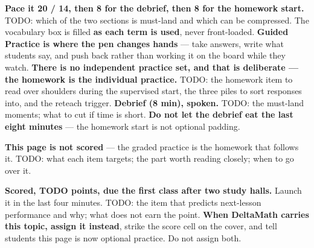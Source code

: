 \documentclass[10pt]{article}
\begin{document}
\begin{teachernote}
\textbf{Pace it 20 / 14, then 8 for the debrief, then 8 for the homework start.} TODO: which of
the two sections is must-land and which can be compressed. The vocabulary box is filled
\textbf{as each term is used}, never front-loaded.
\textbf{Guided Practice is where the pen changes hands} --- take answers, write what students
say, and push back rather than working it on the board while they watch.
\textbf{There is no independent practice set, and that is deliberate --- the homework is the
individual practice.} TODO: the homework item to read over shoulders during the supervised start,
the three piles to sort responses into, and the reteach trigger.
\textbf{Debrief (8 min), spoken.} TODO: the must-land moments; what to cut if time is short.
\textbf{Do not let the debrief eat the last eight minutes} --- the homework start is not
optional padding.
\end{teachernote}

\begin{teachernote}[AP Practice]
\textbf{This page is not scored} --- the graded practice is the homework that follows it. TODO:
what each item targets; the part worth reading closely; when to go over it.
\end{teachernote}

\begin{teachernote}[Homework]
\textbf{Scored, TODO points, due the first class after two study halls.} Launch it in the last four minutes.
TODO: the item that predicts next-lesson performance and why; what does not earn the point.
\textbf{When DeltaMath carries this topic, assign it instead}, strike the score cell on the
cover, and tell students this page is now optional practice. Do not assign both.
\end{teachernote}
\end{document}
